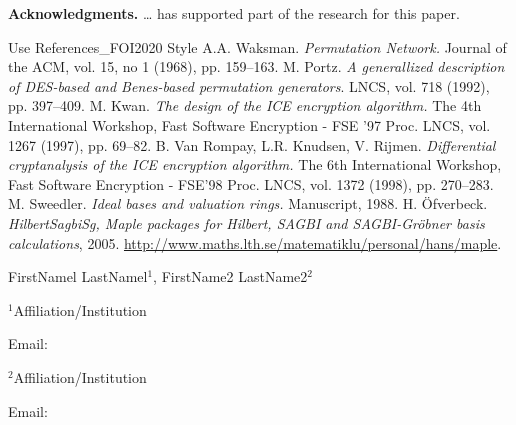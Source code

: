 \documentclass[11pt,twoside,a5paper]{article}
\begin{document}
\textbf{Acknowledgments.} {\ldots} has supported part of the research for 
this paper.

\begin{thebibliography}{99}
 Use References{\_}FOI2020 Style
 A.A. Waksman. \textit{Permutation Network.} Journal of the ACM, vol. 15, no 1 (1968), pp. 159--163.
 M. Portz. \textit{A generallized description of DES-based and Benes-based permutation generators}. LNCS, vol. 718 (1992), pp. 397--409.
 M. Kwan. \textit{The design of the ICE encryption algorithm.} The 4th International Workshop, Fast Software Encryption - FSE '97 Proc. LNCS, vol. 1267 (1997), pp. 69--82.
 B. Van Rompay, L.R. Knudsen, V. Rijmen. \textit{Differential cryptanalysis of the ICE encryption algorithm.} The 6th International Workshop, Fast Software Encryption - FSE'98 Proc. LNCS, vol. 1372 (1998), pp. 270--283.
 M. Sweedler. \textit{Ideal bases and valuation rings.} Manuscript, 1988.
 H. \"{O}fverbeck. \textit{HilbertSagbiSg, Maple packages for Hilbert, SAGBI and SAGBI-Gr\"{o}bner basis calculations}, 2005. \underline {http://www.maths.lth.se/matematiklu/personal/hans/maple}.
\end{thebibliography}


\vspace{2mm}
\begin{center}
\begin{parbox}{118mm}{\footnotesize
FirstNamel LastNamel$^{1}$, FirstName2 LastName2$^{2}$

\vspace{3mm} 

\noindent $^{1}$Affiliation/Institution

\noindent Email:

\vspace{3mm}

\noindent $^{2}$Affiliation/Institution

\noindent Email:

}

\end{parbox}
\end{center}
\end{document}
